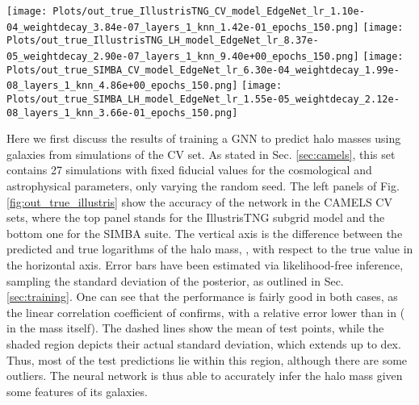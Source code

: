 \documentclass[twocolumn]{aastex631}
\begin{document}
\begin{figure*}[th!]
\begin{center}
\texttt{[image: Plots/out\_true\_IllustrisTNG\_CV\_model\_EdgeNet\_lr\_1.10e-04\_weightdecay\_3.84e-07\_layers\_1\_knn\_1.42e-01\_epochs\_150.png]}
\texttt{[image: Plots/out\_true\_IllustrisTNG\_LH\_model\_EdgeNet\_lr\_8.37e-05\_weightdecay\_2.90e-07\_layers\_1\_knn\_9.40e+00\_epochs\_150.png]}
\texttt{[image: Plots/out\_true\_SIMBA\_CV\_model\_EdgeNet\_lr\_6.30e-04\_weightdecay\_1.99e-08\_layers\_1\_knn\_4.86e+00\_epochs\_150.png]}
\texttt{[image: Plots/out\_true\_SIMBA\_LH\_model\_EdgeNet\_lr\_1.55e-05\_weightdecay\_2.12e-08\_layers\_1\_knn\_3.66e-01\_epochs\_150.png]}
\caption{Predicted versus true logarithm of halo masses  for the CV (left) and LH sets (right), training in the IllustrisTNG suite (top) and in SIMBA (bottom). A sample of 200 halos in the test dataset is shown in each case. Shaded regions and dashed lines correspond to real standard deviation and mean of test points, respectively. While in the CV set, astrophysical and cosmological parameters are fixed to fiducial values, the LH set comprises a broad range of astrophysical and cosmological scenarios. Even so, the GNN is still able to learn the halo/galaxy relation and predict masses in the LH case, only slightly worsening the prediction with respect to the CV case.}
\label{fig:out_true_illustris}
\end{center}
\end{figure*}

Here we first discuss the results of training a GNN to predict halo masses using galaxies from simulations of the CV set. As stated in Sec. \ref{sec:camels}, this set contains 27 simulations with fixed fiducial values for the cosmological and astrophysical parameters, only varying the random seed. The left panels of Fig. \ref{fig:out_true_illustris} show the accuracy of the network in the CAMELS CV sets, where the top panel stands for the IllustrisTNG subgrid model and the bottom one for the SIMBA suite. The vertical axis is the difference between the predicted and true logarithms of the halo mass, , with respect to the true value in the horizontal axis. Error bars have been estimated via likelihood-free inference, sampling the standard deviation of the posterior, as outlined in Sec. \ref{sec:training}. One can see that the performance is fairly good in both cases, as the linear correlation coefficient of  confirms, with a relative error lower than  in  ( in the mass itself). The dashed lines show the mean of test points, while the shaded region depicts their actual standard deviation, which extends up to  dex. Thus, most of the test predictions lie within this region, although there are some outliers. The neural network is thus able to accurately infer the halo mass given some features of its galaxies.
\end{document}
